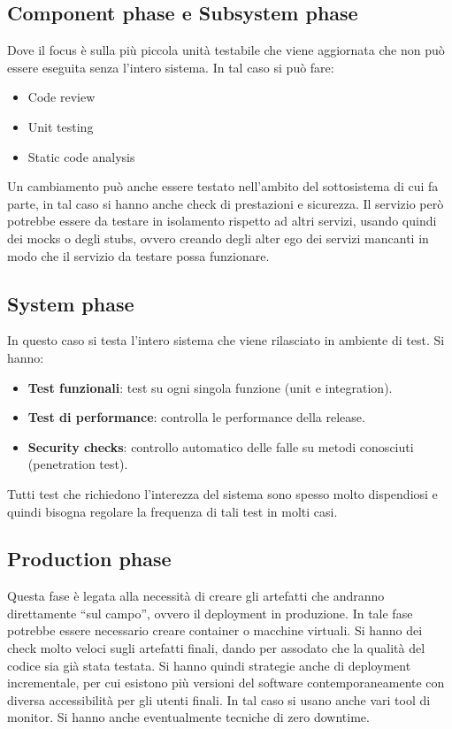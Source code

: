 \subsection{Component phase e Subsystem phase}
Dove il focus è sulla più piccola unità testabile che viene aggiornata che non
può essere eseguita senza l'intero sistema. In tal caso si può fare:
\begin{itemize}
      \item Code review
      \item Unit testing
      \item Static code analysis
\end{itemize}
Un cambiamento può anche essere testato nell'ambito del sottosistema di cui fa
parte, in tal caso si hanno anche check di prestazioni e sicurezza. Il servizio
però potrebbe essere da testare in isolamento rispetto ad altri servizi, usando
quindi dei mocks o degli stubs, ovvero creando degli alter ego dei servizi mancanti
in modo che il servizio da testare possa funzionare.
\subsection{System phase}
In questo caso si testa l'intero sistema che viene rilasciato in ambiente di test.
Si hanno:
\begin{itemize}
      \item \textbf{Test funzionali}: test su ogni singola funzione (unit e integration).
      \item \textbf{Test di performance}: controlla le performance della release.
      \item \textbf{Security checks}: controllo automatico delle falle su metodi conosciuti
            (penetration test).
\end{itemize}
Tutti test che richiedono l'interezza del sistema sono spesso molto dispendiosi
e quindi bisogna regolare la frequenza di tali test in molti casi.
\subsection{Production phase}
Questa fase è legata alla necessità di creare gli artefatti che andranno
direttamente “sul campo”, ovvero il deployment in produzione. In tale fase potrebbe
essere necessario creare container o macchine virtuali. Si hanno dei check molto
veloci sugli artefatti finali, dando per assodato che la qualità del codice sia
già stata testata. Si hanno quindi strategie anche di deployment incrementale, per
cui esistono più versioni del software contemporaneamente con diversa accessibilità
per gli utenti finali. In tal caso si usano anche vari tool di monitor. Si hanno
anche eventualmente tecniche di zero downtime.


